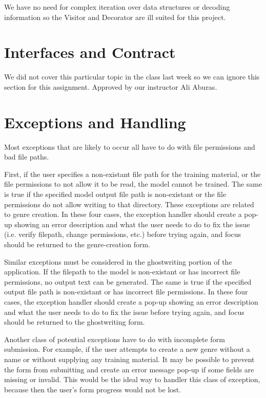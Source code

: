 \documentclass[12pt]{article}
\begin{document}
We have no need for complex iteration over data structures or decoding information so the Visitor and Decorator are ill suited for this project.
\newpage

\section{Interfaces and Contract}

We did not cover this particular topic in the class last week so we can ignore this section for this assignment. Approved by our instructor Ali Aburas.

\section{Exceptions and Handling}

Most exceptions that are likely to occur all have to do with file permissions and bad file paths.

First, if the user specifies a non-existant file path for the training material, or the file permissions to not allow it to be read, the model cannot be trained. The same is true if the specified model output file path is non-existant or the file permissions do not allow writing to that directory. These exceptions are related to genre creation. In these four cases, the exception handler should create a pop-up showing an error description and what the user needs to do to fix the issue (i.e. verify filepath, change permissions, etc.) before trying again, and focus should be returned to the genre-creation form.

Similar exceptions must be considered in the ghostwriting portion of the application. If the filepath to the model is non-existant or has incorrect file permissions, no output text can be generated. The same is true if the specified output file path is non-existant or has incorrect file permissions. In these four cases, the exception handler should create a pop-up showing an error description and what the user needs to do to fix the issue before trying again, and focus should be returned to the ghostwriting form.

Another class of potential exceptions have to do with incomplete form submission. For example, if the user attempts to create a new genre without a name or without supplying any training material. It may be possible to prevent the form from submitting and create an error message pop-up if some fields are missing or invalid. This would be the ideal way to handler this class of exception, because then the user's form progress would not be lost.
\end{document}
